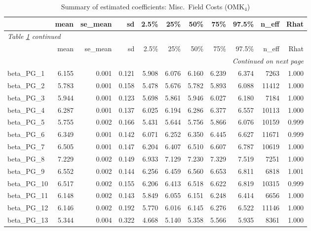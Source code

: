 \documentclass[12pt]{article}
\begin{document}
\begingroup
\footnotesize
\setlength{\tabcolsep}{3pt}
\begin{longtable}{lrrrrrrrrrr}
\caption{Summary of estimated coefficients: Misc.\ Field Costs (OMK$_\text{4}$)}
\label{tab:coef_summary_omk4} \\
\toprule
 & mean & se\_mean & sd & 2.5\% & 25\% & 50\% & 75\% & 97.5\% & n\_eff & Rhat \\
\midrule
\endfirsthead
\multicolumn{11}{l}{\textit{Table \ref{tab:coef_summary_omk4} continued}} \\
\toprule
 & mean & se\_mean & sd & 2.5\% & 25\% & 50\% & 75\% & 97.5\% & n\_eff & Rhat \\
\midrule
\endhead
\midrule
\multicolumn{11}{r}{\textit{Continued on next page}} \\
\endfoot
\bottomrule
\endlastfoot
beta\_PG\_1  &  6.155 & 0.001 & 0.121 &  5.908 &  6.076 &  6.160 &  6.239 &  6.374 &  7263 & 1.000 \\
beta\_PG\_2  &  5.783 & 0.001 & 0.158 &  5.478 &  5.676 &  5.782 &  5.893 &  6.088 & 11412 & 1.000 \\
beta\_PG\_3  &  5.944 & 0.001 & 0.123 &  5.698 &  5.861 &  5.946 &  6.027 &  6.180 &  7184 & 1.000 \\
beta\_PG\_4  &  6.287 & 0.001 & 0.137 &  6.025 &  6.194 &  6.286 &  6.377 &  6.557 & 10113 & 1.000 \\
beta\_PG\_5  &  5.755 & 0.002 & 0.166 &  5.431 &  5.644 &  5.756 &  5.866 &  6.076 & 10159 & 0.999 \\
beta\_PG\_6  &  6.349 & 0.001 & 0.142 &  6.071 &  6.252 &  6.350 &  6.445 &  6.627 & 11671 & 0.999 \\
beta\_PG\_7  &  6.505 & 0.001 & 0.147 &  6.204 &  6.407 &  6.510 &  6.607 &  6.787 & 10619 & 1.000 \\
beta\_PG\_8  &  7.229 & 0.002 & 0.149 &  6.933 &  7.129 &  7.230 &  7.329 &  7.519 &  7251 & 1.000 \\
beta\_PG\_9  &  6.552 & 0.002 & 0.144 &  6.256 &  6.459 &  6.560 &  6.653 &  6.811 &  6818 & 1.001 \\
beta\_PG\_10 &  6.517 & 0.002 & 0.155 &  6.206 &  6.413 &  6.518 &  6.622 &  6.819 & 10315 & 0.999 \\
beta\_PG\_11 &  6.148 & 0.002 & 0.143 &  5.849 &  6.055 &  6.151 &  6.248 &  6.414 &  6656 & 1.000 \\
beta\_PG\_12 &  6.146 & 0.002 & 0.192 &  5.770 &  6.016 &  6.145 &  6.276 &  6.522 & 11146 & 1.000 \\
beta\_PG\_13 &  5.344 & 0.004 & 0.322 &  4.668 &  5.140 &  5.358 &  5.566 &  5.935 &  8361 & 1.000 \\

\end{longtable}
\end{document}
